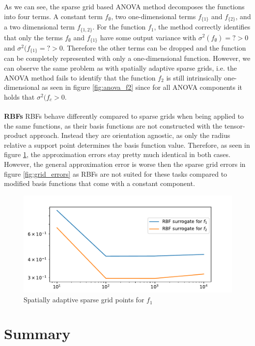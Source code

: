 \documentclass[
  a4paper,  %
  twoside,  %
  bibliography=totoc,
  headsepline,
  cleardoublepage=empty,
  parskip=half,
  draft=false
]{scrbook}
\begin{document}
As we can see, the sparse grid based ANOVA method decomposes the functions into four terms.
A constant term $f_\emptyset$, two one-dimensional terms $f_{\{1\}}$ and $f_{\{2\}}$, and a two dimensional term $f_{\{1,2\}}$.
For the function $f_1$, the method correctly identifies that only the terms $f_\emptyset$ and $f_{\{1\}}$ have some output variance with $\sigma^2(f_\emptyset)=? > 0$ and $\sigma^2(f_{\{1\}}=? > 0$.
Therefore the other terms can be dropped and the function can be completely represented with only a one-dimensional function.
However, we can observe the same problem as with spatially adaptive sparse grids, i.e. the ANOVA method fails to identify that the function $f_2$ is still intrinsically one-dimensional as seen in figure \ref{fig:anova_f2} since for all ANOVA components it holds that $\sigma^2(f_{c}> 0$.
\\
\\
\textbf{RBFs}
RBFs behave differently compared to sparse grids when being applied to the same functions, as their basis functions are not constructed with the tensor-product approach.
Instead they are orientation agnostic, as only the radius relative a support point determines the basis function value.
Therefore, as seen in figure \ref{fig:rbf_errors}, the approximation errors stay pretty much identical in both cases.
However, the general approximation error is worse then the sparse grid errors in figure \ref{fig:grid_errors} as RBFs are not suited for these tasks compared to modified basis functions that come with a constant component.


\begin{figure}[H]
  \centering
  \includegraphics[width=.8\linewidth]{graphics/rbf_errors}
  \caption{Spatially adaptive sparse grid points for $f_1$}
  \label{fig:rbf_errors}
\end{figure}

\section{Summary}
\end{document}
